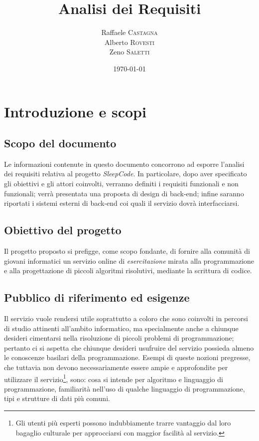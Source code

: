 \documentclass[11pt, a4paper]{article}
\title{Analisi dei Requisiti}
\author{Raffaele \textsc{Castagna}\\
Alberto \textsc{Rovesti}\\
Zeno \textsc{Saletti}}
\date{\today}
\theoremstyle{definition}
\begin{document}


\tableofcontents


\newpage
\section{Introduzione e scopi}
\subsection{Scopo del documento}
Le informazioni contenute in questo documento concorrono ad esporre l'analisi
dei requisiti relativa al progetto \textit{SleepCode}. In particolare, dopo
aver specificato gli obiettivi e gli attori coinvolti, verranno definiti i requisiti
funzionali e non funzionali; verrà presentata una proposta di design di
back-end; infine saranno riportati i sistemi esterni di back-end coi quali il servizio
dovrà interfacciarsi.


\subsection{Obiettivo del progetto}
Il progetto proposto si prefigge, come scopo fondante, di fornire alla comunità
di giovani informatici un servizio online di \textit{esercitazione} mirata alla
programmazione e alla progettazione di piccoli algoritmi risolutivi, mediante
la scrittura di codice.

\subsection{Pubblico di riferimento ed esigenze}
Il servizio vuole rendersi utile soprattutto a coloro che sono coinvolti
in percorsi di studio attinenti all'ambito informatico, ma specialmente anche
a chiunque desideri cimentarsi nella risoluzione di piccoli problemi di
programmazione; pertanto ci si aspetta che chiunque desideri usufruire del
servizio possieda almeno le conoscenze basilari della programmazione. Esempi
di queste nozioni pregresse, che tuttavia non devono necessariamente essere ampie e approfondite per utilizzare il servizio\footnote{Gli utenti più esperti possono indubbiamente trarre vantaggio dal loro bagaglio culturale per
approcciarsi con maggior facilità al servizio.}, sono: cosa si intende per
algoritmo e linguaggio di programmazione, familiarità nell'uso di qualche
linguaggio di programmazione, tipi e strutture di dati più comuni.
\end{document}
